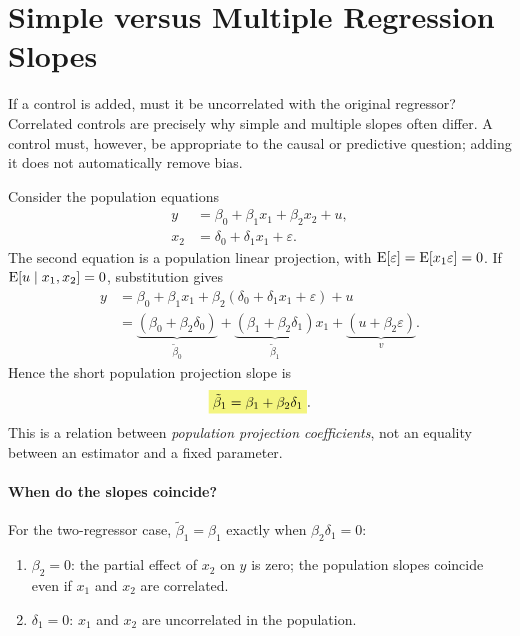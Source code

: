 \section{Simple versus Multiple Regression Slopes}
\label{sec:short-long-week2}
If a control is added, must it be uncorrelated with the original regressor?  Correlated controls are precisely why simple and multiple slopes often differ. A control must, however, be appropriate to the causal or predictive question; adding it does not automatically remove bias.

Consider the population equations
\begin{align*}
y&=\beta_0+\beta_1x_1+\beta_2x_2+u,\\
x_2&=\delta_0+\delta_1x_1+\varepsilon.
\end{align*}
The second equation is a population linear projection, with $\operatorname{E}[\varepsilon]=\operatorname{E}[x_1\varepsilon]=0$. If $\operatorname{E}[u\mid x_1,x_2]=0$, substitution gives
\begin{align*}
y&=\beta_0+\beta_1x_1+\beta_2(\delta_0+\delta_1x_1+\varepsilon)+u\\
 &=\underbrace{(\beta_0+\beta_2\delta_0)}_{\tilde\beta_0}
  +\underbrace{(\beta_1+\beta_2\delta_1)}_{\tilde\beta_1}x_1
  +\underbrace{(u+\beta_2\varepsilon)}_{v}.
\end{align*}
Hence the short population projection slope is
\begin{equation}\label{eq:population-ovb}
\hm{\tilde\beta_1=\beta_1+\beta_2\delta_1}.
\end{equation}
This is a relation between \emph{population projection coefficients}, not an equality between an estimator and a fixed parameter.

\paragraph{When do the slopes coincide?}
For the two-regressor case, $\tilde\beta_1=\beta_1$ exactly when $\beta_2\delta_1=0$:
\begin{enumerate}
\item $\beta_2=0$: the partial effect of $x_2$ on $y$ is zero; the population slopes coincide even if $x_1$ and $x_2$ are correlated.
\item $\delta_1=0$: $x_1$ and $x_2$ are uncorrelated in the population.
\end{enumerate}

